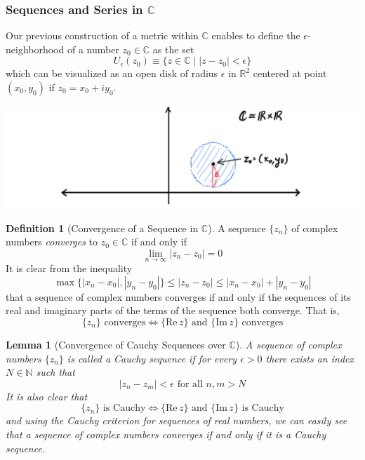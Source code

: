 \documentclass{article}
\newtheorem{lemma}[theorem]{Lemma}
\theoremstyle{remark}
\theoremstyle{definition}
\newtheorem{definition}{Definition}[section]
\begin{document}
\subsubsection[Sequences and Series in C]{Sequences and Series in $\mathbb{C}$}
Our previous construction of a metric within $\mathbb{C}$ enables to define the $\epsilon$-neighborhood of a number $z_0 \in \mathbb{C}$ as the set
\[U_\epsilon (z_0) \equiv \{z \in \mathbb{C}\;|\; |z - z_0| < \epsilon\}\]
which can be visualized as an open disk of radius $\epsilon$ in $\mathbb{R}^2$ centered at point $(x_0, y_0)$ if $z_0 = x_0 + i y_0$. 
\begin{center}
    \includegraphics[scale=0.25]{img/Epsilon_Neighborhood_in_C.jpg}
\end{center}

\begin{definition}[Convergence of a Sequence in $\mathbb{C}$]
A sequence $\{z_n\}$ of complex numbers \textit{converges} to $z_0 \in \mathbb{C}$ if and only if 
\[\lim_{n \rightarrow \infty} |z_n - z_0| = 0\]
It is clear from the inequality
\[\max\{|x_n - x_0|, |y_n - y_0|\} \leq |z_n - z_0| \leq |x_n - x_0| + |y_n - y_0|\]
that a sequence of complex numbers converges if and only if the sequences of its real and imaginary parts of the terms of the sequence both converge. That is, 
\[\{z_n\} \text{ converges} \iff \{\text{Re}\,z\} \text{ and } \{\text{Im}\,z\} \text{ converges}\]
\end{definition}

\begin{lemma}[Convergence of Cauchy Sequences over $\mathbb{C}$]
A sequence of complex numbers $\{z_n\}$ is called a \textit{Cauchy sequence} if for every $\epsilon>0$ there exists an index $N \in \mathbb{N}$ such that
\[|z_n - z_m|<\epsilon \text{ for all } n, m > N\]
It is also clear that 
\[\{z_n\} \text{ is Cauchy} \iff \{\text{Re}\,z\} \text{ and } \{\text{Im}\,z\} \text{ is Cauchy}\]
and using the Cauchy criterion for sequences of real numbers, we can easily see that a sequence of complex numbers converges if and only if it is a Cauchy sequence. 
\end{lemma}
\end{document}

